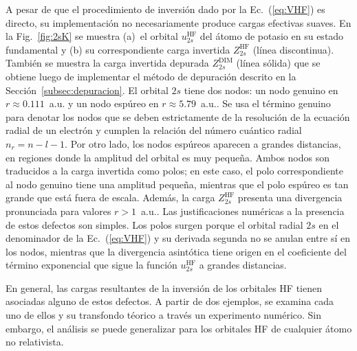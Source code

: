 A pesar de que el procedimiento de inversión dado por la 
Ec.~(\ref{eq:VHF}) es directo, su implementación no necesariamente 
produce cargas efectivas suaves. En la Fig.~\ref{fig:2sK} se muestra 
(a)~el orbital $u_{2s}^{\mathrm{HF}}$ del átomo de potasio en su estado 
fundamental y (b) su correspondiente carga invertida 
$Z_{2s}^{\mathrm{HF}}$ (línea discontinua). También se muestra la carga
invertida depurada $Z_{2s}^{\mathrm{DIM}}$ (línea sólida) que se obtiene 
luego de implementar el método de depuración descrito en la 
Sección~\ref{subsec:depuracion}. 
El orbital $2s$ tiene dos nodos: un nodo genuino en 
$r\approx 0.111$~a.u. y un nodo espúreo en $r\approx 5.79$~a.u.. Se usa 
el término genuino para denotar los nodos que se deben estrictamente de 
la resolución de la ecuación radial de un electrón y cumplen la relación 
del número cuántico radial $n_r=n-l-1$. Por otro lado, los nodos 
espúreos aparecen a grandes distancias, en regiones donde la amplitud 
del orbital es muy pequeña. Ambos nodos son traducidos a la carga 
invertida como polos; en este caso, el polo correspondiente al nodo 
genuino tiene una amplitud pequeña, mientras que el polo espúreo es tan 
grande que está fuera de escala. Además, la carga $Z_{2s}^{\mathrm{HF}}$ 
presenta una divergencia pronunciada para valores $r>1$~a.u.. Las 
justificaciones numéricas a la presencia de estos defectos son simples. 
Los polos surgen porque el orbital radial $2s$ en el denominador de la 
Ec.~(\ref{eq:VHF}) y su derivada segunda no se anulan entre sí en los 
nodos, mientras que la divergencia asintótica tiene origen en el 
coeficiente del término exponencial que sigue la función 
$u_{2s}^{\mathrm{HF}}$ a grandes distancias.



En general, las cargas resultantes de la inversión de los orbitales HF 
tienen asociadas alguno de estos defectos. A partir de dos ejemplos, 
se examina cada uno de ellos y su transfondo téorico a través un 
experimento numérico. Sin embargo, el análisis se puede generalizar 
para los orbitales HF de cualquier átomo no relativista.

